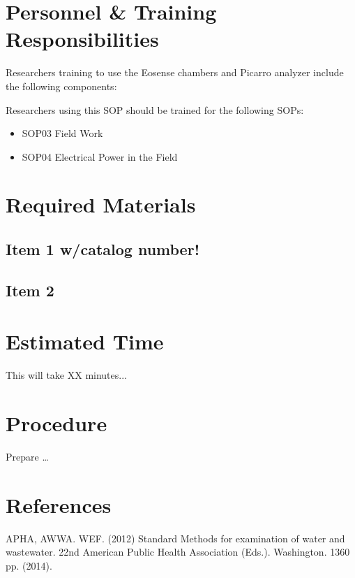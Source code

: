 \documentclass[12pt]{../SOP3_beta}
\begin{document}
\section{Personnel \& Training Responsibilities}

Researchers training to use the Eosense chambers and Picarro analyzer include the following components: 



Researchers using this SOP should be trained for the following SOPs:

\begin{itemize}
  \item SOP03 Field Work
  \item SOP04 Electrical Power in the Field
\end{itemize}

\section{Required Materials}

\subsection{Item 1 w/catalog number!}
\subsection{Item 2}

\section{Estimated Time}

\NP This will take XX minutes...

\section{Procedure}

\NP Prepare \dots

\NP

\section{References}

\NP APHA, AWWA. WEF. (2012) Standard Methods for examination of water and wastewater. 22nd American Public Health Association (Eds.). Washington. 1360 pp. (2014).
\end{document}
